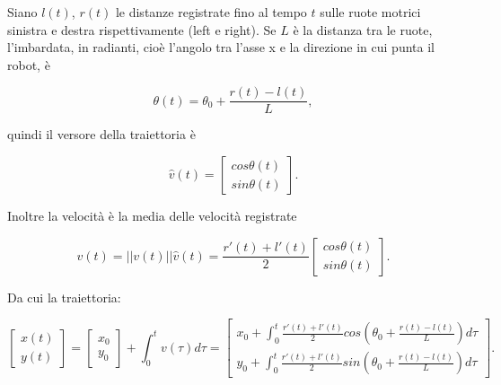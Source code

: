 \documentclass{article}
\begin{document}
\noindent
Siano $l(t)$, $r(t)$ le distanze registrate fino al tempo $t$ sulle
ruote motrici sinistra e destra rispettivamente (left e right). Se $L$ è la
distanza tra le ruote, l'imbardata, in radianti, cioè l'angolo tra l'asse x e
la direzione in cui punta il robot, è

\begin{equation}
	\theta (t) = \theta_0 + \frac{r(t)-l(t)}{L},
\end{equation}

\noindent
quindi il versore della traiettoria è

\begin{equation}
	\hat{v} (t) = \begin{bmatrix} cos\theta (t) \\ sin\theta (t) \end{bmatrix}.
\end{equation}

\noindent
Inoltre la velocità è la media delle velocità registrate

\begin{equation}
	v(t)=||v(t)||\hat{v}(t) = \frac{r'(t)+l'(t)}{2}\begin{bmatrix}cos\theta (t) \\
	sin\theta (t) \end{bmatrix}.
\end{equation}

\noindent 
Da cui la traiettoria:

\begin{equation}
	\begin{bmatrix}x(t)\\ y(t) \end{bmatrix} = \begin{bmatrix}x_0 \\ y_0
	\end{bmatrix} +\int_0^t v(\tau )d\tau = \begin{bmatrix}x_0 + \int_0^t
	\frac{r'(t)+l'(t)}{2} cos(\theta_0 + \frac{r(t)-l(t)}{L})d\tau \\ y_0 +
	\int_0^t \frac{r'(t)+l'(t)}{2} sin(\theta_0 + \frac{r(t)-l(t)}{L})d\tau
	\end{bmatrix}.
\end{equation}
\end{document}
